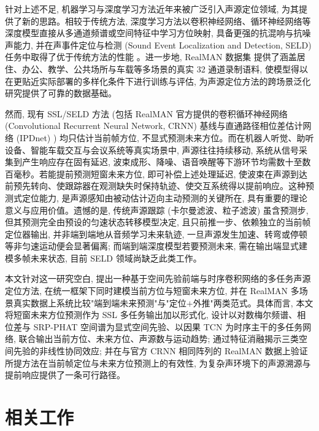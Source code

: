 \documentclass[lang=cn,a4paper,newtx]{elegantpaper}
\begin{document}
针对上述不足, 机器学习与深度学习方法近年来被广泛引入声源定位领域, 为其提供了新的思路。相较于传统方法, 深度学习方法以卷积神经网络、循环神经网络等深度模型直接从多通道频谱或空间特征中学习方位映射, 具备更强的抗混响与抗噪声能力, 并在声事件定位与检测 (Sound Event Localization and Detection, SELD) 任务中取得了优于传统方法的性能 \cite{adavanne2019seldnet,grumiaux2022survey}。进一步地, RealMAN 数据集 \cite{yang2024realman} 提供了涵盖居住、办公、教学、公共场所与车载等多场景的真实 32 通道录制语料, 使模型得以在更贴近实际部署的多样化条件下进行训练与评估, 为声源定位方法的跨场景泛化研究提供了可靠的数据基础。

然而, 现有 SSL/SELD 方法 (包括 RealMAN 官方提供的卷积循环神经网络 (Convolutional Recurrent Neural Network, CRNN) 基线与直通路径相位差估计网络 (IPDnet) \cite{wang2024ipdnet}) 均只估计当前帧方位, 不显式预测未来方位。而在机器人听觉、助听设备、智能车载交互与会议系统等真实场景中, 声源往往持续移动, 系统从信号采集到产生响应存在固有延迟, 波束成形、降噪、语音唤醒等下游环节均需数十至数百毫秒。若能提前预测短窗未来方位, 即可补偿上述处理延迟, 使波束在声源到达前预先转向、使跟踪器在观测缺失时保持轨迹、使交互系统得以提前响应。这种预测式定位能力, 是声源感知由被动估计迈向主动预测的关键所在, 具有重要的理论意义与应用价值。遗憾的是, 传统声源跟踪 (卡尔曼滤波、粒子滤波) 虽含预测步, 但其预测完全由预设的匀速状态转移模型决定, 且只前推一步、依赖独立的当前帧定位器输出, 并非端到端地从音频学习未来轨迹, 一旦声源发生加速、转弯或停顿等非匀速运动便会显著偏离; 而端到端深度模型若要预测未来, 需在输出端显式建模多帧未来状态, 目前 SELD 领域尚缺乏此类工作。

本文针对这一研究空白, 提出一种基于空间先验前端与时序卷积网络的多任务声源定位方法, 在统一框架下同时建模当前方位与短窗未来方位, 并在 RealMAN 多场景真实数据上系统比较"端到端未来预测"与"定位$+$外推"两类范式。具体而言, 本文将短窗未来方位预测作为 SSL 多任务输出加以形式化, 设计以对数梅尔频谱、相位差与 SRP-PHAT 空间谱为显式空间先验、以因果 TCN 为时序主干的多任务网络, 联合输出当前方位、未来方位、声源数与运动趋势; 通过特征消融揭示三类空间先验的非线性协同效应; 并在与官方 CRNN 相同阵列的 RealMAN 数据上验证所提方法在当前帧定位与未来方位预测上的有效性, 为复杂声环境下的声源溯源与提前响应提供了一条可行路径。

\section{相关工作}
\end{document}
